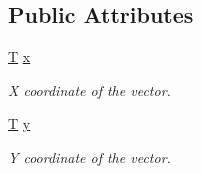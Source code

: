\subsection*{Public Attributes}
\begin{DoxyCompactItemize}
\item 
\hyperlink{curses_8priv_8h_a5ef253115820acf7d27f3c5c3b02a0f0}{T} \hyperlink{classsf_1_1_vector2_a1e6ad77fa155f3753bfb92699bd28141}{x}
\begin{DoxyCompactList}\small\item\em X coordinate of the vector. \end{DoxyCompactList}\item 
\hyperlink{curses_8priv_8h_a5ef253115820acf7d27f3c5c3b02a0f0}{T} \hyperlink{classsf_1_1_vector2_a420f2481b015f4eb929c75f2af564299}{y}
\begin{DoxyCompactList}\small\item\em Y coordinate of the vector. \end{DoxyCompactList}\end{DoxyCompactItemize}
